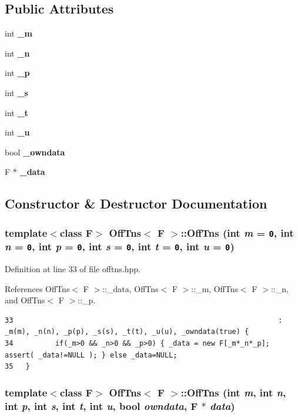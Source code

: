 \subsection*{Public Attributes}
\begin{CompactItemize}
\item 
int {\bf \_\-m}
\item 
int {\bf \_\-n}
\item 
int {\bf \_\-p}
\item 
int {\bf \_\-s}
\item 
int {\bf \_\-t}
\item 
int {\bf \_\-u}
\item 
bool {\bf \_\-owndata}
\item 
F $\ast$ {\bf \_\-data}
\end{CompactItemize}


\subsection{Constructor \& Destructor Documentation}
\subsubsection{\setlength{\rightskip}{0pt plus 5cm}template$<$class F$>$ {\bf Off\-Tns}$<$ F $>$::{\bf Off\-Tns} (int {\em m} = {\tt 0}, int {\em n} = {\tt 0}, int {\em p} = {\tt 0}, int {\em s} = {\tt 0}, int {\em t} = {\tt 0}, int {\em u} = {\tt 0})\hspace{0.3cm}{\tt  [inline]}}\label{classOffTns_ae163af621cd8e4a928772fb2d7939cf_ae163af621cd8e4a928772fb2d7939cf}




Definition at line 33 of file offtns.hpp.

References Off\-Tns$<$ F $>$::\_\-data, Off\-Tns$<$ F $>$::\_\-m, Off\-Tns$<$ F $>$::\_\-n, and Off\-Tns$<$ F $>$::\_\-p.

\footnotesize\begin{verbatim}33                                                               : _m(m), _n(n), _p(p), _s(s), _t(t), _u(u), _owndata(true) {
34          if(_m>0 && _n>0 && _p>0) { _data = new F[_m*_n*_p]; assert( _data!=NULL ); } else _data=NULL;
35   }
\end{verbatim}\normalsize 


\subsubsection{\setlength{\rightskip}{0pt plus 5cm}template$<$class F$>$ {\bf Off\-Tns}$<$ F $>$::{\bf Off\-Tns} (int {\em m}, int {\em n}, int {\em p}, int {\em s}, int {\em t}, int {\em u}, bool {\em owndata}, F $\ast$ {\em data})\hspace{0.3cm}{\tt  [inline]}}\label{classOffTns_16a97062db021b8453ef0c32cb8a3b5a_16a97062db021b8453ef0c32cb8a3b5a}




